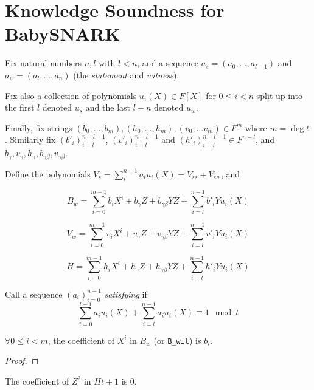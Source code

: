 \chapter{Knowledge Soundness for BabySNARK}\label{chap:test2}

Fix natural numbers $n, l$ with $l < n$, and a sequence $a_s = (a_0, \ldots, a_{l-1})$ and $a_w = (a_l, \ldots, a_n)$ (the \emph{statement} and \emph{witness}). 

Fix also a collection of polynomials $u_i(X) \in F[X]$ for $0 \leq i < n$ split up into the first $l$ denoted $u_s$ and the last $l-n$ denoted $u_w$. 

Finally, fix strings $(b_0, \ldots,b_m), (h_0, \ldots, h_m), (v_0, \ldots v_m) \in F^m$ where $m = \deg t$. Similarly fix $(b'_i)_{i = l}^{n - l - 1}$, $(v'_i)_{i = l}^{n - l - 1}$ and $(h'_i)_{i = l}^{n - l - 1} \in F^{n-l}$, and $b_\gamma, v_\gamma, h_\gamma, b_{\gamma\beta}, v_{\gamma\beta}$.

\begin{definition}\label{def:V_B_H}
\leanok
Define the polynomials $V_s = \sum_i^{n-1} a_i u_i(X) = V_{ss} + V_{sw}$, and 

\[
B_w = \sum_{i = 0}^{m - 1} b_i X^i + b_{\gamma}Z + b_{\gamma \beta}YZ + \sum_{i = l}^{n - 1} b'_{i} Y u_{i}(X)
\]

\[
V_w = \sum_{i = 0}^{m - 1} v_i X^i + v_{\gamma}Z + v_{\gamma \beta}YZ + \sum_{i = l}^{n - 1} v'_{i} Y u_{i}(X)
\]

\[
H = \sum_{i = 0}^{m - 1} h_i X^i + h_{\gamma}Z + h_{\gamma \beta}YZ + \sum_{i = l}^{n - 1} h'_{i} Y u_{i}(X)
\]
\end{definition}

\begin{definition}\label{def:satisfying}
\leanok
{}
Call a sequence $(a_i)_{i=0}^{n-1}$ \emph{satisfying} if 
\[
\sum_{i = 0}^{l - 1} a_i u_i(X) + \sum_{i = l}^{n - 1} a_i u_i (X) \equiv 1 \mod t
\]
\end{definition}

\begin{lemma}\label{lem:B_coeff}
\leanok
{}
$\forall 0 \le i < m$, the coefficient of $X^{i}$ in $B_{w}$ (or \texttt{B\_wit}) is $b_i$.
\end{lemma}
\begin{proof}
\leanok
\end{proof}

\begin{lemma} \label{lem:Z2_Ht_coeff}
\leanok
The coefficient of $Z^2$ in $H t + 1$ is 0.
\end{lemma}

